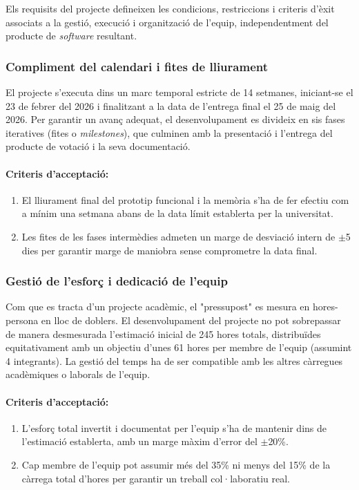 Els requisits del projecte defineixen les condicions, restriccions i criteris d'èxit associats a la gestió, execució i organització de l'equip, independentment del producte de \textit{software} resultant.

\subsubsection{Compliment del calendari i fites de lliurament}

El projecte s'executa dins un marc temporal estricte de 14 setmanes, iniciant-se el 23 de febrer del 2026 i finalitzant a la data de l'entrega final el 25 de maig del 2026. 
Per garantir un avanç adequat, el desenvolupament es divideix en sis fases iteratives (fites o \textit{milestones}), que culminen amb la presentació i l'entrega del producte de votació i la seva documentació.

\paragraph{Criteris d'acceptació:}
\begin{enumerate}[label=\roman*.]
    \item El lliurament final del prototip funcional i la memòria s'ha de fer efectiu com a mínim una setmana abans de la data límit establerta per la universitat.
    \item Les fites de les fases intermèdies admeten un marge de desviació intern de $\pm$5 dies per garantir marge de maniobra sense comprometre la data final.
\end{enumerate}

\subsubsection{Gestió de l'esforç i dedicació de l'equip}

Com que es tracta d'un projecte acadèmic, el "pressupost" es mesura en hores-persona en lloc de doblers. 
El desenvolupament del projecte no pot sobrepassar de manera desmesurada l'estimació inicial de 245 hores totals, distribuïdes equitativament amb un objectiu d'unes 61 hores per membre de l'equip (assumint 4 integrants). 
La gestió del temps ha de ser compatible amb les altres càrregues acadèmiques o laborals de l'equip.

\paragraph{Criteris d'acceptació:}
\begin{enumerate}[label=\roman*.]
    \item L'esforç total invertit i documentat per l'equip s'ha de mantenir dins de l'estimació establerta, amb un marge màxim d'error del $\pm$20\%.
    \item Cap membre de l'equip pot assumir més del 35\% ni menys del 15\% de la càrrega total d'hores per garantir un treball col·laboratiu real.
\end{enumerate}

